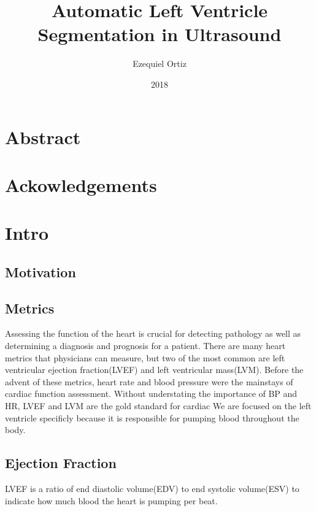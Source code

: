 \documentclass{article}
\title{Automatic Left Ventricle Segmentation in Ultrasound}
\date{2018}
\author{Ezequiel Ortiz}
\begin{document}
\maketitle
{}
\newpage
{}
\section{Abstract}
\section{Ackowledgements}
\section{Intro}
\subsection{Motivation}
\subsection{Metrics}

Assessing the function of the heart is crucial for detecting pathology as well as determining a diagnosis and prognosis for a patient.
There are many heart metrics that physicians can measure, but two of the most common are left ventricular ejection fraction(LVEF) and left ventricular mass(LVM).
Before the advent of these metrics, heart rate and blood pressure were the mainstays of cardiac function assessment.
Without understating the importance of BP and HR, LVEF and LVM are the gold standard for cardiac 
We are focused on the left ventricle specificly because it is responsible for pumping blood throughout the body.

\subsection{Ejection Fraction}
LVEF is a ratio of end diastolic volume(EDV) to end systolic volume(ESV) to indicate how much blood the heart is pumping per beat.
\end{document}
